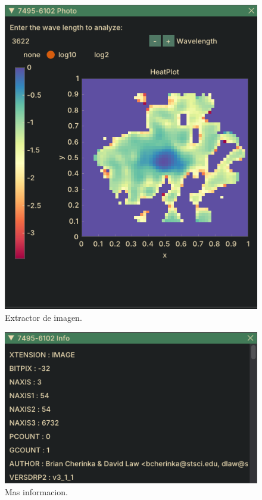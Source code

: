 \documentclass[9pt,twocolumn,a4paper]{opticajnl}
\begin{document}
\begin{figure}
    \centering
    \includegraphics[width=1\linewidth]{VIsor_heatmap.png}
    \caption{Extractor de imagen.}
    \label{fig:VIsor_heatmap}
\end{figure}

\begin{figure}
    \centering
    \includegraphics[width=1\linewidth]{moreinfo.png}
    \caption{Mas informacion.}
    \label{fig:moreinfo}
\end{figure}
\end{document}
